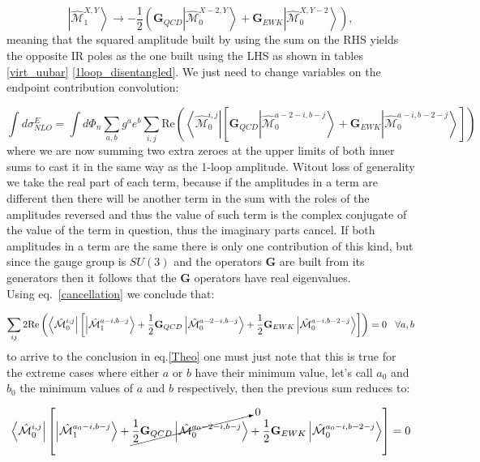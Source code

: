 \documentclass[a4paper]{article}
\def \MBra#1#2#3{\left<\hat{\mathcal{M}}_{#1}^{#2,#3}\right|}
\def \MKet#1#2#3{\left|\hat{\mathcal{M}}_{#1}^{#2,#3}\right>}
\begin{document}
\begin{equation}
 \MKet{1}{X}{Y} \rightarrow -\frac{1}{2}
 \left(
 \textbf{G}_{QCD}\MKet{0}{X-2}{Y} 
 + 
 \textbf{G}_{EWK}\MKet{0}{X}{Y-2}
 \right),
 \label{Theo}
\end{equation}
meaning that the squared amplitude built by using the sum on the RHS yields the opposite IR poles as the 
one built using the LHS as shown in tables \ref{virt_uubar} \ref{1loop_disentangled}. 
We just need to change variables on the endpoint contribution convolution:

\begin{equation}
 \int d\sigma^E_{NLO} = \int d\Phi_{n}
 \sum_{a,b} g^{a} e^{b} 
 \sum_{i,j}
 \text{Re}\left(
 \MBra{0}{i}{j}
 \left[
 \textbf{G}_{QCD}\MKet{0}{a-2-i}{b-j}
 +
 \textbf{G}_{EWK}\MKet{0}{a-i}{b-2-j}
 \right]
 \right)
\end{equation}
where we are now summing two extra zeroes at the upper limits of both inner sums to cast it in the same 
way as the 1-loop amplitude. Witout loss of generality we take the real part of each term, 
because if the amplitudes in a term are different then there will be another term in the sum with the roles of the amplitudes reversed and thus the value of such term is the complex conjugate of the value of the term in question, thus the imaginary parts cancel. 
If both amplitudes in a term are the same there is only one contribution of this 
kind, but since the gauge group is $SU(3)$ and the operators $\textbf{G}$ are built from its 
generators then it follows that the $\textbf{G}$ operators have real eigenvalues.\\

Using eq.~\eqref{cancellation} we conclude that:

\begin{equation}
 \sum_{ij}2\text{Re}
 \left(
 \MBra{0}{i}{j}
 \left[
 \MKet{1}{a-i}{b-j}
 +
 \frac{1}{2}\textbf{G}_{QCD}\MKet{0}{a-2-i}{b-j}
 +
 \frac{1}{2}\textbf{G}_{EWK}\MKet{0}{a-i}{b-2-j}
 \right]
 \right)=0 \hskip0.3cm \forall a,b
\end{equation}
to arrive to the conclusion in eq.\eqref{Theo} one must just note that this is true for the extreme cases 
where either $a$ or $b$ have their minimum value, let's call $a_0$ and $b_0$ the minimum values of $a$ and $b$
respectively, then the previous sum reduces to:

\begin{equation}
 \MBra{0}{i}{j}
 \left[
 \MKet{1}{a_0-i}{b-j}
 +
 \cancelto{0}{\frac{1}{2}\textbf{G}_{QCD}\MKet{0}{a_0-2-i}{b-j}}
 +
 \frac{1}{2}\textbf{G}_{EWK}\MKet{0}{a_0-i}{b-2-j}
 \right]=0
\end{equation}
\end{document}
